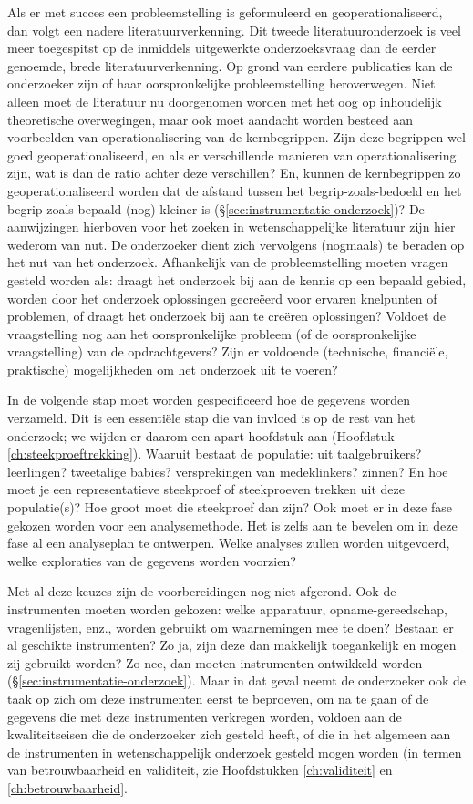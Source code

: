 \documentclass[
]{book}
\begin{document}
Als er met succes een probleemstelling is geformuleerd en
geoperationaliseerd, dan volgt een nadere literatuurverkenning. Dit
tweede literatuuronderzoek is veel meer toegespitst op de inmiddels
uitgewerkte onderzoeksvraag dan de eerder genoemde, brede
literatuurverkenning. Op grond van eerdere publicaties kan de
onderzoeker zijn of haar oorspronkelijke probleemstelling heroverwegen.
Niet alleen moet de literatuur nu doorgenomen worden met het oog op
inhoudelijk theoretische overwegingen, maar ook moet aandacht worden
besteed aan voorbeelden van operationalisering van de kernbegrippen.
Zijn deze begrippen wel goed geoperationaliseerd, en als er
verschillende manieren van operationalisering zijn, wat is dan de ratio
achter deze verschillen? En, kunnen de kernbegrippen zo
geoperationaliseerd worden dat de afstand tussen het
begrip-zoals-bedoeld en het begrip-zoals-bepaald (nog) kleiner is
(§\ref{sec:instrumentatie-onderzoek})? De aanwijzingen hierboven
voor het zoeken in wetenschappelijke literatuur zijn hier wederom van
nut. De onderzoeker dient zich vervolgens (nogmaals) te beraden op het
nut van het onderzoek. Afhankelijk van de probleemstelling moeten vragen
gesteld worden als: draagt het onderzoek bij aan de kennis op een
bepaald gebied, worden door het onderzoek oplossingen gecreëerd voor
ervaren knelpunten of problemen, of draagt het onderzoek bij aan te
creëren oplossingen? Voldoet de vraagstelling nog aan het
oorspronkelijke probleem (of de oorspronkelijke vraagstelling) van de
opdrachtgevers? Zijn er voldoende (technische, financiële, praktische)
mogelijkheden om het onderzoek uit te voeren?

In de volgende stap moet worden gespecificeerd hoe de gegevens worden
verzameld. Dit is een essentiële stap die van invloed is op de rest van
het onderzoek; we wijden er daarom een apart hoofdstuk aan
(Hoofdstuk \ref{ch:steekproeftrekking}).
Waaruit bestaat de populatie: uit
taalgebruikers? leerlingen? tweetalige babies? versprekingen van
medeklinkers? zinnen? En hoe moet je een representatieve steekproef of
steekproeven trekken uit deze populatie(s)? Hoe groot moet die
steekproef dan zijn? Ook moet er in deze fase gekozen worden voor een
analysemethode. Het is zelfs aan te bevelen om in deze fase al een
analyseplan te ontwerpen. Welke analyses zullen worden uitgevoerd, welke exploraties van de gegevens worden voorzien?

Met al deze keuzes zijn de voorbereidingen nog niet afgerond. Ook de
instrumenten moeten worden gekozen: welke apparatuur,
opname-gereedschap, vragenlijsten, enz., worden gebruikt om waarnemingen
mee te doen? Bestaan er al geschikte instrumenten? Zo ja, zijn deze dan
makkelijk toegankelijk en mogen zij gebruikt worden? Zo nee, dan moeten
instrumenten ontwikkeld worden
(§\ref{sec:instrumentatie-onderzoek}).
Maar in dat geval neemt de
onderzoeker ook de taak op zich om deze instrumenten eerst te beproeven,
om na te gaan of de gegevens die met deze instrumenten verkregen worden,
voldoen aan de kwaliteitseisen die de onderzoeker zich gesteld heeft, of
die in het algemeen aan de instrumenten in wetenschappelijk onderzoek
gesteld mogen worden (in termen van betrouwbaarheid en validiteit, zie
Hoofdstukken \ref{ch:validiteit} en \ref{ch:betrouwbaarheid}.
\end{document}
